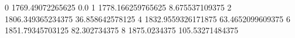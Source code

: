 0 1769.49072265625 0.0
1 1778.166259765625 8.675537109375
2 1806.349365234375 36.858642578125
4 1832.9559326171875 63.4652099609375
6 1851.79345703125 82.302734375
8 1875.0234375 105.53271484375
